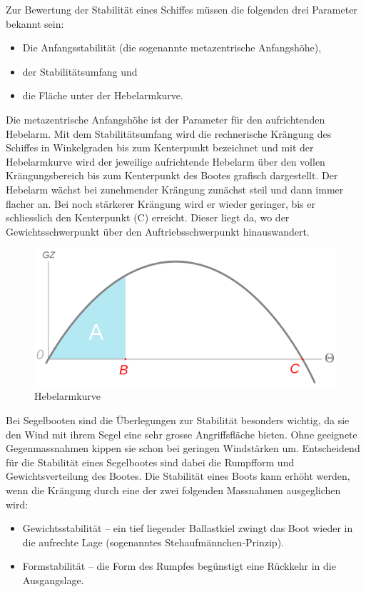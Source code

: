 Zur Bewertung der Stabilität eines Schiffes müssen die folgenden drei Parameter bekannt sein: 
\begin{itemize}
    \item Die Anfangsstabilität (die sogenannte metazentrische Anfangshöhe),
    \item der Stabilitätsumfang und
    \item die Fläche unter der Hebelarmkurve.
\end{itemize}
Die metazentrische Anfangshöhe ist der Parameter für den aufrichtenden Hebelarm. Mit dem Stabilitätsumfang wird die rechnerische Krängung des Schiffes in Winkelgraden bis zum Kenterpunkt bezeichnet und mit der Hebelarmkurve wird der jeweilige aufrichtende Hebelarm über den vollen Krängungsbereich bis zum Kenterpunkt des Bootes grafisch dargestellt.
Der Hebelarm wächst bei zunehmender Krängung zunächst steil und dann immer flacher an. Bei noch stärkerer Krängung wird er wieder geringer, bis er schliesslich den Kenterpunkt (C) erreicht. Dieser liegt da, wo der Gewichtsschwerpunkt über den Auftriebsschwerpunkt hinauswandert. \cite{noauthor_stabilitat_2023}

\begin{figure}[H]
    \centering
    \includegraphics[width=0.5\linewidth]{Stability_curve_NT.svg.png}
    \caption{Hebelarmkurve}
    \label{fig:enter-label}
\end{figure}
Bei Segelbooten sind die Überlegungen zur Stabilität besonders wichtig, da sie den Wind mit ihrem Segel eine sehr grosse Angriffsfläche bieten. Ohne geeignete Gegenmassnahmen kippen sie schon bei geringen Windstärken um. Entscheidend für die Stabilität eines Segelbootes sind dabei die Rumpfform und Gewichtsverteilung des Bootes. Die Stabilität eines Boots kann erhöht werden, wenn die Krängung durch eine der zwei folgenden Massnahmen ausgeglichen wird:
\begin{itemize}
    \item Gewichtsstabilität – ein tief liegender Ballastkiel zwingt das Boot wieder in die aufrechte Lage (sogenanntes Stehaufmännchen-Prinzip).
    \item Formstabilität – die Form des Rumpfes begünstigt eine Rückkehr in die Ausgangslage.
\end{itemize}
